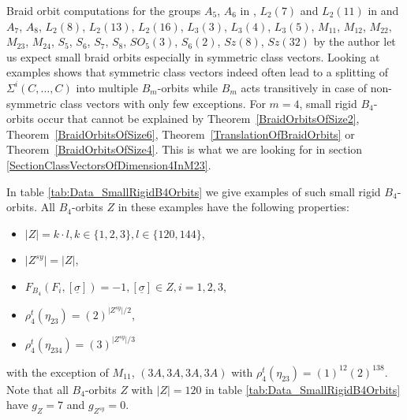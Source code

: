 \documentclass[12pt,a4paper]{article}
\numberwithin{equation}{section}
\numberwithin{table}{section}
\begin{document}
\noindent
Braid orbit computations for the groups $A_5$, $A_6$ in \cite{RefJam2013},
$L_2(7)$ and $L_2(11)$ in \cite{RefFir2015} and
$A_7$, $A_8$,
$L_2(8)$, $L_2(13)$, $L_2(16)$, $L_3(3)$, $L_3(4)$, $L_3(5)$,
$M_{11}$, $M_{12}$, $M_{22}$, $M_{23}$, $M_{24}$,
$S_5$, $S_6$, $S_7$, $S_8$,
$SO_5(3)$, $S_6(2)$, 
$Sz(8)$, $Sz(32)$
by the author let us expect small braid orbits especially in symmetric class vectors.
%
Looking at examples shows that symmetric class vectors indeed often
lead to a splitting of $\Sigma^i(C,\dots, C)$ into multiple $B_m$-orbits
while $B_m$ acts transitively in case of non-symmetric class vectors with only few exceptions.
For $m=4$, small rigid $B_4$-orbits occur that cannot be explained by Theorem~\ref{BraidOrbitsOfSize2},
Theorem~\ref{BraidOrbitsOfSize6}, Theorem~\ref{TranslationOfBraidOrbits} or Theorem~\ref{BraidOrbitsOfSize4}.
This is what we are looking for in section \ref{SectionClassVectorsOfDimension4InM23}.
\par
\noindent
In table \ref{tab:Data_SmallRigidB4Orbits} we give examples of such small rigid $B_4$-orbits.
All $B_4$-orbits $Z$ in these examples have the following properties:
\begin{itemize}
\item[]
$\vert Z \vert = k \cdot l, k \in \{1, 2, 3\}, l \in \{120, 144\}$,
\item[]
$\vert Z^{sy} \vert = \vert Z \vert$,
\item[]
$F_{B_4}(F_i,[\underline{\sigma}])=-1, [\underline{\sigma}] \in Z, i=1,2,3$,
\item[]
$\rho^t_4(\eta_{23}) = (2)^{\vert Z^{sy} \vert /2}$,
\item[]
$\rho^t_4(\eta_{234}) = (3)^{\vert Z^{sy} \vert /3}$
\end{itemize}
with the exception of $M_{11}$, $(3A,3A,3A,3A)$ with $\rho^t_4(\eta_{23}) = (1)^{12}(2)^{138}$.
%
Note that all $B_4$-orbits $Z$ with $\vert Z \vert = 120$ in table \ref{tab:Data_SmallRigidB4Orbits}
have $g_Z = 7$ and $g_{Z^{sy}} = 0$.
%
\end{document}
